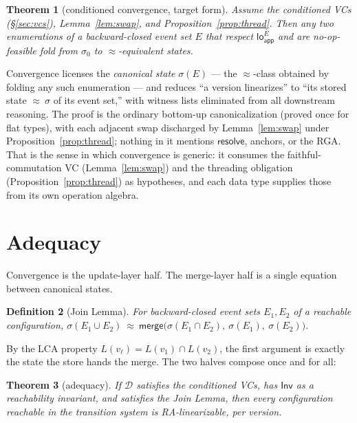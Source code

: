 \documentclass[11pt]{article}
\newtheorem{theorem}{Theorem}[section]
\newtheorem{definition}[theorem]{Definition}
\newcommand{\Merge}{\mathsf{merge}}
\newcommand{\Sinit}{\sigma_0}
\newcommand{\Inv}{\mathsf{Inv}}
\newcommand{\app}{\mathsf{app}}
\newcommand{\loA}[1]{\mathsf{lo}_{\!\app}^{#1}}
\newcommand{\eqobs}{\approx}
\newcommand{\resolve}{\mathsf{resolve}}
\begin{document}
\begin{theorem}[conditioned convergence, target form]
\label{thm:conv}
Assume the conditioned VCs (\S\ref{sec:vcs}), Lemma~\ref{lem:swap}, and
Proposition~\ref{prop:thread}. Then any two enumerations of a backward-closed
event set $E$ that respect $\loA{E}$ and are no-op-feasible fold from $\Sinit$
to $\eqobs$-equivalent states.
\end{theorem}

Convergence licenses the \emph{canonical state} $\sigma(E)$ --- the
$\eqobs$-class obtained by folding any such enumeration --- and reduces
``a version linearizes'' to ``its stored state $\eqobs\ \sigma$ of its event
set,'' with witness lists eliminated from all downstream reasoning. The proof is
the ordinary bottom-up canonicalization (proved once for flat types), with each
adjacent swap discharged by Lemma~\ref{lem:swap} under
Proposition~\ref{prop:thread}; nothing in it mentions $\resolve$, anchors, or the
RGA. That is the sense in which convergence is generic: it consumes the
faithful-commutation VC (Lemma~\ref{lem:swap}) and the threading obligation
(Proposition~\ref{prop:thread}) as hypotheses, and each data type supplies those
from its own operation algebra.

\section{Adequacy}
\label{sec:adequacy}

Convergence is the update-layer half. The merge-layer half is a single equation
between canonical states.

\begin{definition}[Join Lemma]
\label{def:join}
For backward-closed event sets $E_1,E_2$ of a reachable configuration,
$\sigma(E_1\cup E_2)\ \eqobs\ \Merge\big(\sigma(E_1\cap E_2),\ \sigma(E_1),\
\sigma(E_2)\big)$.
\end{definition}

By the LCA property $L(v_\ell)=L(v_1)\cap L(v_2)$, the first argument is exactly
the state the store hands the merge. The two halves compose once and for all:

\begin{theorem}[adequacy]
\label{thm:adequacy}
If $\mathcal{D}$ satisfies the conditioned VCs, has $\Inv$ as a reachability
invariant, and satisfies the Join Lemma, then every configuration reachable in
the transition system is RA-linearizable, per version.
\end{theorem}
\end{document}
